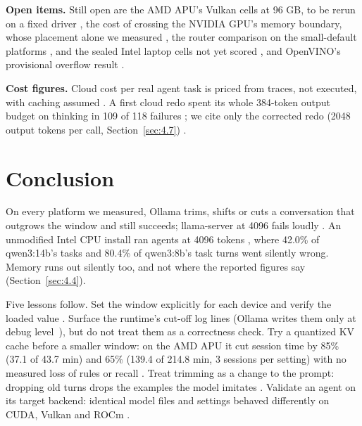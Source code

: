 \documentclass[conference,10pt]{IEEEtran}
\begin{document}
\textbf{Open items.} Still open are the AMD APU's Vulkan cells at 96 GB, to be rerun on a fixed driver%
, the cost of crossing the NVIDIA GPU's memory boundary, whose placement alone we measured%
, the router comparison on the small-default platforms%
, and the sealed Intel laptop cells not yet scored%
, and OpenVINO's provisional overflow result%
.

\textbf{Cost figures.} Cloud cost per real agent task is priced from traces, not executed, with caching assumed%
. A first cloud redo spent its whole 384-token output budget on thinking in 109 of 118 failures%
; we cite only the corrected redo (2048 output tokens per call, Section~\ref{sec:4.7})%
.

\section{Conclusion}\label{sec:4.9}

On every platform we measured, Ollama trims, shifts or cuts a conversation that outgrows the window and still succeeds; llama-server at 4096 fails loudly%
. An unmodified Intel CPU install ran agents at 4096 tokens%
, where 42.0\% of qwen3:14b's tasks %
and 80.4\% of qwen3:8b's task turns %
went silently wrong. Memory runs out silently too, and not where the reported figures say (Section~\ref{sec:4.4}).

Five lessons follow. Set the window explicitly for each device and verify the loaded value%
. Surface the runtime's cut-off log lines (Ollama writes them only at debug level~\cite{ollama14259}), but do not treat them as a correctness check. Try a quantized KV cache before a smaller window: on the AMD APU it cut session time by 85\% (37.1 of 43.7 min) and 65\% (139.4 of 214.8 min, 3 sessions per setting) with no measured loss of rules or recall%
. Treat trimming as a change to the prompt: dropping old turns drops the examples the model imitates%
. Validate an agent on its target backend: identical model files and settings behaved differently on CUDA, Vulkan and ROCm%
.



\end{document}
